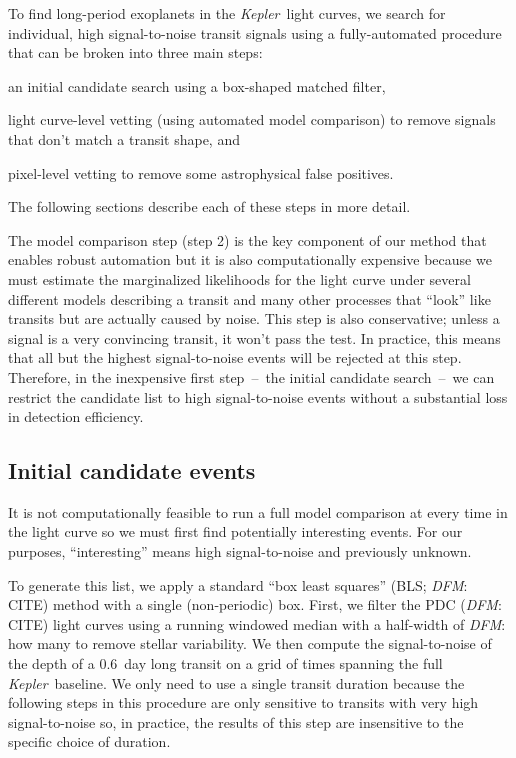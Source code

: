 \documentclass[manuscript, letterpaper]{aastex6}
\newcommand{\project}[1]{\textsl{#1}}
\newcommand{\kepler}{\project{Kepler}}
\newcommand{\todo}[3]{{\color{#2}\emph{#1}: #3}}
\newcommand{\dfmtodo}[1]{\todo{DFM}{red}{#1}}
\begin{document}
To find long-period exoplanets in the \kepler\ light curves, we search for
individual, high signal-to-noise transit signals using a fully-automated
procedure that can be broken into three main steps:
\begin{enumerate}
{\item an initial candidate search using a box-shaped matched filter,}
{\item light curve-level vetting (using automated model comparison) to remove
signals that don't match a transit shape, and}
{\item pixel-level vetting to remove some astrophysical false positives.}
\end{enumerate}
The following sections describe each of these steps in more detail.

The model comparison step (step 2) is the key component of our method that
enables robust automation but it is also computationally expensive because we
must estimate the marginalized likelihoods for the light curve under several
different models describing a transit and many other processes that ``look''
like transits but are actually caused by noise.
This step is also conservative; unless a signal is a very convincing transit,
it won't pass the test.
In practice, this means that all but the highest signal-to-noise events will
be rejected at this step.
Therefore, in the inexpensive first step~--~the initial candidate search~--~we
can restrict the candidate list to high signal-to-noise events without a
substantial loss in detection efficiency.

\subsection{Initial candidate events}

It is not computationally feasible to run a full model comparison at every
time in the light curve so we must first find potentially interesting events.
For our purposes, ``interesting'' means high signal-to-noise and previously
unknown.

To generate this list, we apply a standard ``box least squares'' (BLS;
\dfmtodo{CITE}) method with a single (non-periodic) box.
First, we filter the PDC (\dfmtodo{CITE}) light curves using a running
windowed median with a half-width of \dfmtodo{how many} to remove stellar
variability.
We then compute the signal-to-noise of the depth of a 0.6~day long transit on
a grid of times spanning the full \kepler\ baseline.
We only need to use a single transit duration because the following steps in
this procedure are only sensitive to transits with very high signal-to-noise
so, in practice, the results of this step are insensitive to the specific
choice of duration.
\end{document}
